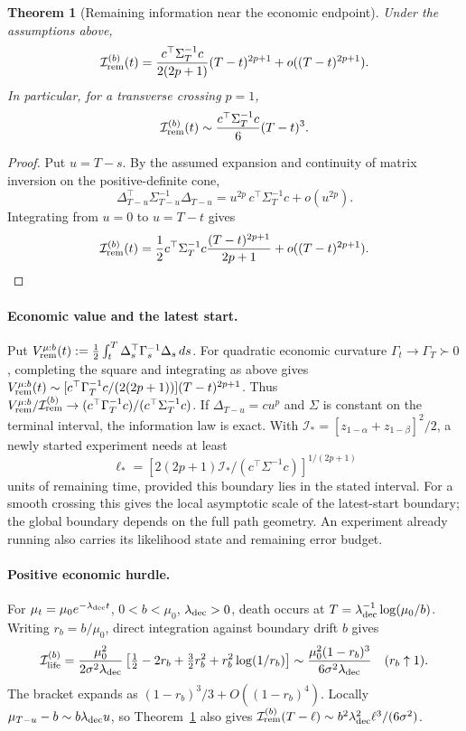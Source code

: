 \documentclass[11pt]{article}
\numberwithin{equation}{section}
\theoremstyle{plain}
\newtheorem{theorem}{Theorem}[section]
\theoremstyle{definition}
\theoremstyle{remark}
\begin{document}
\begin{theorem}[Remaining information near the economic endpoint]\label{thm:terminal-collapse}
Under the assumptions above,
\[
\mathcal I_{\rm rem}^{(b)}(t)
=\frac{c^\top\Sigma_T^{-1}c}{2(2p+1)}(T-t)^{2p+1}
+o((T-t)^{2p+1}).
\]
In particular, for a transverse crossing $p=1$,
\[
\mathcal I_{\rm rem}^{(b)}(t)
\sim \frac{c^\top\Sigma_T^{-1}c}{6}(T-t)^3.
\]
\end{theorem}

\begin{proof}
Put \(u=T-s\). By the assumed expansion and continuity
of matrix inversion on the positive-definite cone, \[
\Delta_{T-u}^\top\Sigma_{T-u}^{-1}\Delta_{T-u}
=u^{2p}\,c^\top\Sigma_T^{-1}c+o(u^{2p}).
\] Integrating from \(u=0\) to \(u=T-t\) gives \[
\mathcal I_{\rm rem}^{(b)}(t)
=\frac12 c^\top\Sigma_T^{-1}c
\frac{(T-t)^{2p+1}}{2p+1}
+o((T-t)^{2p+1}).
\] \end{proof}

\paragraph{Economic value and the latest start.}\label{economic-value-has-the-same-exponent}\label{latest-feasible-start}
Put $V_{\rm rem}^{\mu:b}(t):=\tfrac12\int_t^T\Delta_s^\top\Gamma_s^{-1}\Delta_s\,ds$. For quadratic economic curvature $\Gamma_t\to\Gamma_T\succ0$, completing the square and integrating as above gives $V_{\rm rem}^{\mu:b}(t)\sim[c^\top\Gamma_T^{-1}c/(2(2p+1))](T-t)^{2p+1}$. Thus $V_{\rm rem}^{\mu:b}/\mathcal I_{\rm rem}^{(b)}\to(c^\top\Gamma_T^{-1}c)/(c^\top\Sigma_T^{-1}c)$. If $\Delta_{T-u}=cu^p$ and $\Sigma$ is constant on the terminal interval, the information law is exact. With $\mathcal I_*=[z_{1-\alpha}+z_{1-\beta}]^2/2$, a newly started experiment needs at least
\[
\ell_*=[2(2p+1)\mathcal I_* /(c^\top\Sigma^{-1}c)]^{1/(2p+1)}
\]
units of remaining time, provided this boundary lies in the stated interval. For a smooth crossing this gives the local asymptotic scale of the latest-start boundary; the global boundary depends on the full path geometry. An experiment already running also carries its likelihood state and remaining error budget.

\paragraph{Positive economic hurdle.}\label{exponential-decay-with-a-positive-economic-hurdle}\label{cubic-near-hurdle-collapse}
For $\mu_t=\mu_0e^{-\lambda_{\rm dec}t}$, $0<b<\mu_0$, $\lambda_{\rm dec}>0$, death occurs at $T=\lambda_{\rm dec}^{-1}\log(\mu_0/b)$. Writing $r_b=b/\mu_0$, direct integration against boundary drift $b$ gives
\[
\mathcal I_{\rm life}^{(b)}=\frac{\mu_0^2}{2\sigma^2\lambda_{\rm dec}}
\left[\tfrac12-2r_b+\tfrac32r_b^2+r_b^2\log(1/r_b)\right]
\sim\frac{\mu_0^2(1-r_b)^3}{6\sigma^2\lambda_{\rm dec}}
\quad(r_b\uparrow1).
\]
The bracket expands as $(1-r_b)^3/3+O((1-r_b)^4)$. Locally $\mu_{T-u}-b\sim b\lambda_{\rm dec}u$, so Theorem~\ref{thm:terminal-collapse} also gives $\mathcal I_{\rm rem}^{(b)}(T-\ell)\sim b^2\lambda_{\rm dec}^2\ell^3/(6\sigma^2)$.
\end{document}
